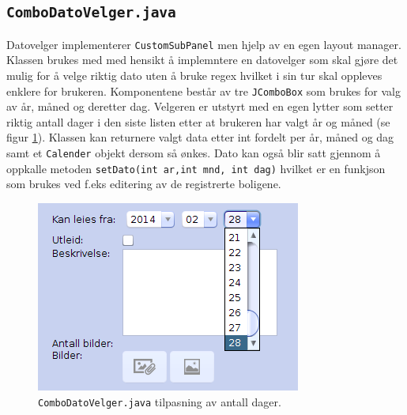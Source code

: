 \subsection{\texttt{ComboDatoVelger.java}}
Datovelger implementerer \texttt{CustomSubPanel} men hjelp av en egen layout manager. Klassen brukes med med hensikt å implemntere en datovelger som skal gjøre det mulig for å velge riktig dato uten å bruke regex hvilket i sin tur skal oppleves enklere for brukeren. Komponentene består av tre \texttt{JComboBox} som brukes for valg av år, måned og deretter dag. Velgeren er utstyrt med en egen lytter som setter riktig antall dager i den siste listen etter at brukeren har valgt år og måned (se figur \ref{fig:combo_datovelger}).
Klassen kan returnere valgt data etter int fordelt per år, måned og dag samt et \texttt{Calender} objekt dersom så ønkes. Dato kan også blir satt gjennom å oppkalle metoden \texttt{setDato(int ar,int mnd, int dag)} hvilket er en funkjson som brukes ved f.eks editering av de registrerte boligene. 


\begin{figure}[ht]
\center
 \includegraphics[scale=0.5]{./img/produktdokumentasjon/swing_componenter/combo_datovelger.png}
 \caption{\texttt{ComboDatoVelger.java} tilpasning av antall dager.}
 \label{fig:combo_datovelger}
\end{figure}

